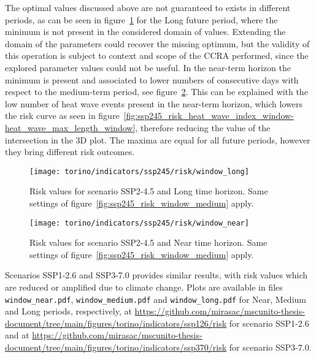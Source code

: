 The optimal values discussed above are not guaranteed to exists in different periods, as can be seen in figure~\ref{fig:ssp245_risk_window_long} for the Long future period, where the minimum is not present in the considered domain of values. Extending the domain of the parameters could recover the missing optimum, but the validity of this operation is subject to context and scope of the \gls{CCRA} performed, since the explored parameter values could not be useful.
In the near-term horizon the minimum is present and associated to lower numbers of consecutive days with respect to the medium-term period, see figure~\ref{fig:ssp245_risk_window_near}. This can be explained with the low number of heat wave events present in the near-term horizon, which lowers the risk curve as seen in figure~\ref{fig:ssp245_risk_heat_wave_index_window-heat_wave_max_length_window}, therefore reducing the value of the intersection in the 3D plot.
The maxima are equal for all future periods, however they bring different risk outcomes.

\begin{figure}
  \centering
  \texttt{[image: torino/indicators/ssp245/risk/window\_long]}
  \caption{Risk values for scenario SSP2-4.5 and Long time horizon. Same settings of figure~\ref{fig:ssp245_risk_window_medium} apply.}
  \label{fig:ssp245_risk_window_long}
\end{figure}

\begin{figure}
  \centering
  \texttt{[image: torino/indicators/ssp245/risk/window\_near]}
  \caption{Risk values for scenario SSP2-4.5 and Near time horizon. Same settings of figure~\ref{fig:ssp245_risk_window_medium} apply.}
  \label{fig:ssp245_risk_window_near}
\end{figure}

Scenarios SSP1-2.6 and SSP3-7.0 provides similar results, with risk values which are reduced or amplified due to climate change. Plots are available in files \verb|window_near.pdf|, \verb|window_medium.pdf| and \verb|window_long.pdf| for Near, Medium and Long periods, respectively, at \url{https://github.com/mirasac/mscunito-thesis-document/tree/main/figures/torino/indicators/ssp126/risk} for scenario SSP1-2.6 and at \url{https://github.com/mirasac/mscunito-thesis-document/tree/main/figures/torino/indicators/ssp370/risk} for scenario SSP3-7.0.
